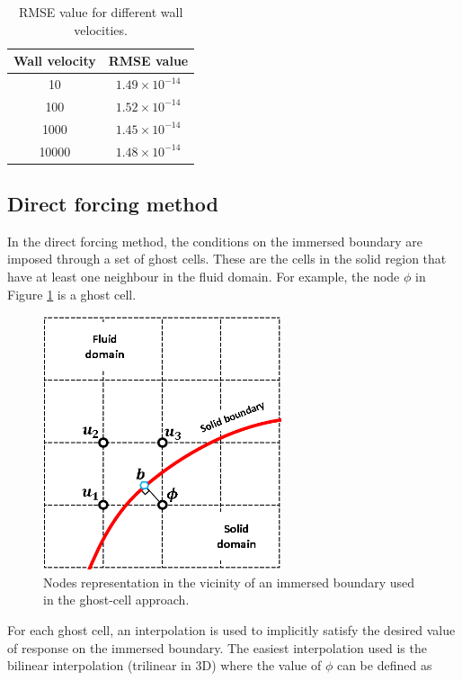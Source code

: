 \begin{table}[H]
\centering
\begin{tabular}{c | c}
     Wall velocity & RMSE value \\ \hline \hline
     10 & $1.49 \times 10^{-14}$ \\ \hline
     100 & $1.52 \times 10^{-14}$ \\ \hline
     1000 & $1.45 \times 10^{-14}$ \\ \hline
     10000 & $1.48 \times 10^{-14}$

\end{tabular}
\caption{RMSE value for different wall velocities.}
\label{table:C3_indirectForcing_wallVelocityRSME}
\end{table}

\subsection{Direct forcing method}
In the direct forcing method, the conditions on the immersed boundary are imposed through a set of ghost cells. These are the cells in the solid region that have at least one neighbour in the fluid domain. For example, the node $\phi$ in Figure \ref{fig:C3_ghostCell} is a ghost cell.

\begin{figure}[H]
    \centering
    \includegraphics[width=7.00cm]{Chapter_3/figure/discrete_forcing_approach.png}
    \caption{Nodes representation in the vicinity of an immersed boundary used in the ghost-cell approach.}
    \label{fig:C3_ghostCell}
\end{figure}

For each ghost cell, an interpolation is used to implicitly satisfy the desired value of response on the immersed boundary. The easiest interpolation used is the bilinear interpolation (trilinear in 3D) where the value of $\phi$ can be defined as

